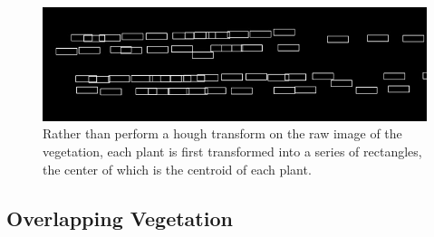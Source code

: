 \documentclass[letterpaper]{article}
\begin{document}
{\begin{figure}[h!]
	\centering
	\includegraphics[width=0.8\linewidth]{./figures/hough-transform-rectangles.jpg}
	\caption[Rectangles for hough transform]{Rather than perform a hough transform on the raw image of the vegetation, each plant is first transformed into a series of rectangles, the center of which is the centroid of each plant. }
	\label{fig:hough-transform}
\end{figure}



\subsection{Overlapping Vegetation}
\label{problem-overlap}

}
\end{document}
